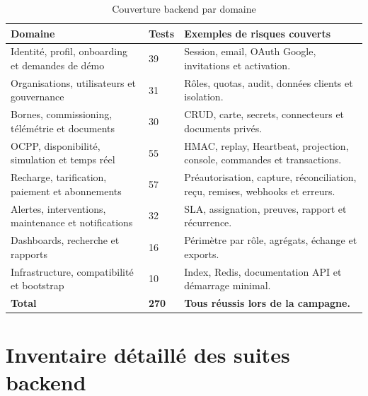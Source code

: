 \begin{table}[H]
\centering
\caption{Couverture backend par domaine}
\begin{tabularx}{\textwidth}{|Y|C{2.2cm}|L{5.2cm}|}
\hline
{}\textbf{Domaine} & \textbf{Tests} & \textbf{Exemples de risques couverts} \\ \hline
Identité, profil, onboarding et demandes de démo & 39 & Session, email, OAuth Google, invitations et activation. \\ \hline
Organisations, utilisateurs et gouvernance & 31 & Rôles, quotas, audit, données clients et isolation. \\ \hline
Bornes, commissioning, télémétrie et documents & 30 & CRUD, carte, secrets, connecteurs et documents privés. \\ \hline
OCPP, disponibilité, simulation et temps réel & 55 & HMAC, replay, Heartbeat, projection, console, commandes et transactions. \\ \hline
Recharge, tarification, paiement et abonnements & 57 & Préautorisation, capture, réconciliation, reçu, remises, webhooks et erreurs. \\ \hline
Alertes, interventions, maintenance et notifications & 32 & SLA, assignation, preuves, rapport et récurrence. \\ \hline
Dashboards, recherche et rapports & 16 & Périmètre par rôle, agrégats, échange et exports. \\ \hline
Infrastructure, compatibilité et bootstrap & 10 & Index, Redis, documentation API et démarrage minimal. \\ \hline
\textbf{Total} & \textbf{270} & \textbf{Tous réussis lors de la campagne.} \\ \hline
\end{tabularx}
\end{table}

\section{Inventaire détaillé des suites backend}

